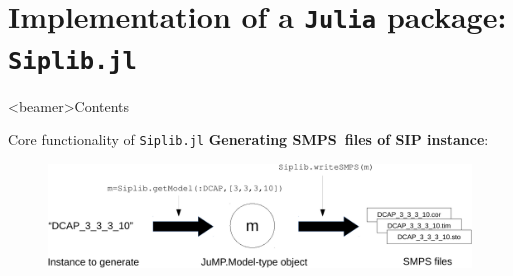 \documentclass{beamer}
\newcommand{\smps}{\textsf{SMPS}}
\newcommand{\structjump}{\textsf{StructJuMP}}
\newcommand{\siplibjl}{\texttt{Siplib.jl}}
\begin{document}
%		
%		
%		
%		
%		
%		
%		


	\section{Implementation of a \texttt{Julia} package: \textbf{\texttt{Siplib.jl}}}
	\begin{frame}<beamer>{Contents}
	\end{frame}	

	\begin{frame}{Core functionality of \siplibjl}
		\textbf{Generating \smps\ files of SIP instance}:
		\begin{figure}
			\begin{center}
				\includegraphics[width=\textwidth]{siplib_package}
			\end{center}
		\end{figure}	
	\end{frame}
\end{document}
